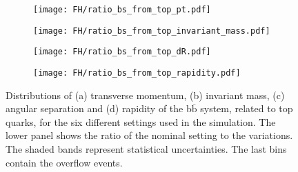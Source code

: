 \begin{figure}[H]
    \centering
    \begin{subfigure}{0.49\textwidth}
        \centering
        \texttt{[image: FH/ratio\_bs\_from\_top\_pt.pdf]}
        \caption{}
        \label{app:subfig:pt(bbbar)_FH}
    \end{subfigure}
    \begin{subfigure}{0.49\textwidth}
        \centering
        \texttt{[image: FH/ratio\_bs\_from\_top\_invariant\_mass.pdf]}
        \caption{}
        \label{app:subfig:m(bbbar)_FH}
    \end{subfigure}

    \vspace{0.2cm}
    
    \begin{subfigure}{0.49\textwidth}
        \centering
        \texttt{[image: FH/ratio\_bs\_from\_top\_dR.pdf]}
        \caption{}
        \label{app:subfig:dR(bbbar)_FH}
    \end{subfigure}
    \begin{subfigure}{0.49\textwidth}
        \centering
        \texttt{[image: FH/ratio\_bs\_from\_top\_rapidity.pdf]}
        \caption{}
        \label{app:subfig:y(bbbar)_FH}
    \end{subfigure}
    \caption{Distributions of (a) transverse momentum, (b) invariant mass,  (c) angular separation and (d) rapidity of the b$\overline{\text{b}}$ system, related to top quarks, for the six different settings used in the simulation. The lower panel shows the ratio of the nominal setting to the variations. The shaded bands represent statistical uncertainties. The last bins contain the overflow events.}
    \label{app:fig:bbbar_FH}
\end{figure}

